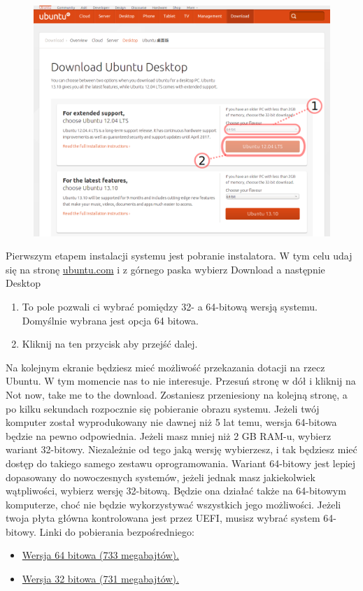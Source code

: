 \begin{figure}
        \includegraphics[scale=0.45]{images/instalacja_pobieranie_obrazu.png}
\end{figure}
Pierwszym etapem instalacji systemu jest pobranie instalatora. W tym celu udaj się na stronę \href{http://www.ubuntu.com/download/desktop}{ubuntu.com} i z górnego paska wybierz \textcolor{ubuntu_orange}{Download} a następnie \textcolor{ubuntu_orange}{Desktop}
\begin{enumerate}
\item To pole pozwali ci wybrać pomiędzy 32- a 64-bitową wersją systemu. Domyślnie wybrana jest opcja 64 bitowa.
\item Kliknij na ten przycisk aby przejść dalej.
\end{enumerate}
Na kolejnym ekranie będziesz mieć możliwość przekazania dotacji na rzecz Ubuntu. W tym momencie nas to nie interesuje. Przesuń stronę w dół i kliknij na \textcolor{ubuntu_orange}{Not now, take me to the download}. Zostaniesz przeniesiony na kolejną stronę, a po kilku sekundach rozpocznie się pobieranie obrazu systemu.
Jeżeli twój komputer został wyprodukowany nie dawnej niż 5 lat temu, wersja 64-bitowa będzie na pewno odpowiednia. Jeżeli masz mniej niż 2 GB RAM-u, wybierz wariant 32-bitowy. Niezależnie od tego jaką wersję wybierzesz, i tak będziesz mieć dostęp do takiego samego zestawu oprogramowania. Wariant 64-bitowy jest lepiej dopasowany do nowoczesnych systemów, jeżeli jednak masz jakiekolwiek wątpliwości, wybierz wersję 32-bitową. Będzie ona działać także na 64-bitowym komputerze, choć nie będzie wykorzystywać wszystkich jego możliwości.
Jeżeli twoja płyta główna kontrolowana jest przez UEFI, musisz wybrać system 64-bitowy.
Linki do pobierania bezpośredniego:
\begin{itemize}
\item \href{http://www.ubuntu.com/start-download?distro=desktop&bits=64&release=lts}{Wersja 64 bitowa (733 megabajtów).}
\item \href{http://www.ubuntu.com/start-download?distro=desktop&bits=32&release=lts}{Wersja 32 bitowa (731 megabajtów).}
\end{itemize}
\clearpage
